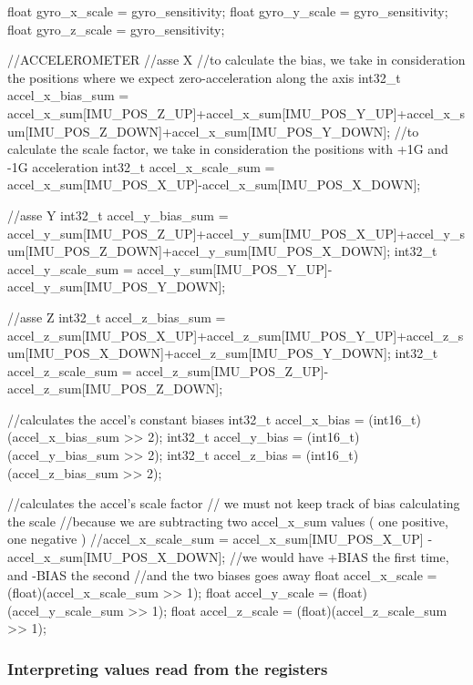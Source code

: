 \begin{ccode}
	float gyro_x_scale = gyro_sensitivity;
	float gyro_y_scale = gyro_sensitivity;
	float gyro_z_scale = gyro_sensitivity;
	
	//ACCELEROMETER	
	//asse X
		//to calculate the bias, we take in consideration the positions where we expect zero-acceleration along the axis
	int32_t accel_x_bias_sum = accel_x_sum[IMU_POS_Z_UP]+accel_x_sum[IMU_POS_Y_UP]+accel_x_sum[IMU_POS_Z_DOWN]+accel_x_sum[IMU_POS_Y_DOWN];
		//to calculate the scale factor, we take in consideration the positions with +1G and -1G acceleration
	int32_t accel_x_scale_sum = accel_x_sum[IMU_POS_X_UP]-accel_x_sum[IMU_POS_X_DOWN];
	
	//asse Y
	int32_t accel_y_bias_sum = accel_y_sum[IMU_POS_Z_UP]+accel_y_sum[IMU_POS_X_UP]+accel_y_sum[IMU_POS_Z_DOWN]+accel_y_sum[IMU_POS_X_DOWN];
	int32_t accel_y_scale_sum = accel_y_sum[IMU_POS_Y_UP]-accel_y_sum[IMU_POS_Y_DOWN];
	
	//asse Z
	int32_t accel_z_bias_sum = accel_z_sum[IMU_POS_X_UP]+accel_z_sum[IMU_POS_Y_UP]+accel_z_sum[IMU_POS_X_DOWN]+accel_z_sum[IMU_POS_Y_DOWN];
	int32_t accel_z_scale_sum = accel_z_sum[IMU_POS_Z_UP]-accel_z_sum[IMU_POS_Z_DOWN];
	
		//calculates the accel's constant biases
	int32_t accel_x_bias = (int16_t)(accel_x_bias_sum >> 2);
	int32_t accel_y_bias = (int16_t)(accel_y_bias_sum >> 2);
	int32_t accel_z_bias = (int16_t)(accel_z_bias_sum >> 2);
	
		//calculates the accel's scale factor
			// we must not keep track of bias calculating the scale
				//because we are subtracting two accel_x_sum values ( one positive, one negative )
					//accel_x_scale_sum = accel_x_sum[IMU_POS_X_UP] - accel_x_sum[IMU_POS_X_DOWN];
						//we would have +BIAS the first time, and -BIAS the second
					//and the two biases goes away
	float accel_x_scale = (float)(accel_x_scale_sum >> 1);
	float accel_y_scale = (float)(accel_y_scale_sum >> 1);
	float accel_z_scale = (float)(accel_z_scale_sum >> 1);
\end{ccode}

\subsubsection{Interpreting values read from the registers}

